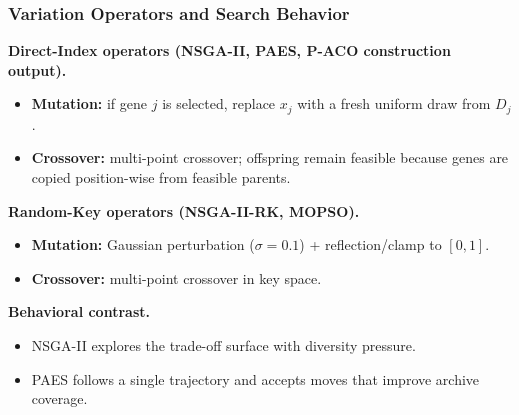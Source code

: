 \documentclass[aspectratio=169,10pt]{beamer}
\begin{document}
\begin{frame}
\frametitle{Variation Operators and Search Behavior}

\textbf{Direct-Index operators (NSGA-II, PAES, P-ACO construction output).}
\begin{itemize}
  \item \textbf{Mutation:} if gene $j$ is selected, replace $x_j$ with a fresh uniform draw from $D_j$.
  \item \textbf{Crossover:} multi-point crossover; offspring remain feasible because genes are copied position-wise from feasible parents.
\end{itemize}

\vspace{0.25cm}

\textbf{Random-Key operators (NSGA-II-RK, MOPSO).}
\begin{itemize}
  \item \textbf{Mutation:} Gaussian perturbation ($\sigma=0.1$) + reflection/clamp to $[0,1]$.
  \item \textbf{Crossover:} multi-point crossover in key space.
\end{itemize}

\vspace{0.25cm}

\textbf{Behavioral contrast.}
\begin{itemize}
  \item NSGA-II explores the trade-off surface with diversity pressure.
  \item PAES follows a single trajectory and accepts moves that improve archive coverage.
\end{itemize}

\end{frame}
\end{document}
